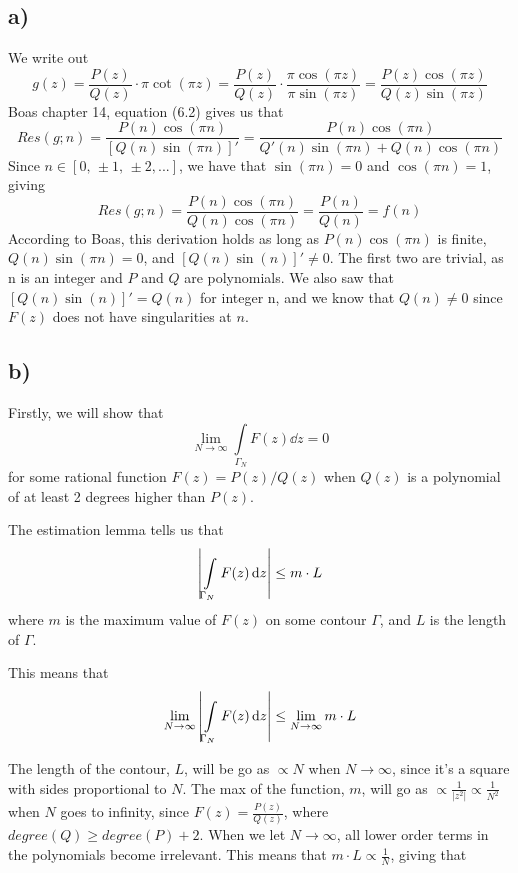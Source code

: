 \documentclass[10pt,a4paper]{article}
\newcommand{\limN}{\lim_{N\rightarrow \infty}}
\newcommand{\Gammaint}{\int\limits_{\Gamma_N}}
\begin{document}
\subsection*{a)}
We write out
\begin{equation}
    g(z) = \frac{P(z)}{Q(z)}\cdot \pi \cot(\pi z) = \frac{P(z)}{Q(z)}\cdot \frac{\pi \cos(\pi z)}{\pi \sin(\pi z)} = \frac{P(z) \cos(\pi z)}{Q(z) \sin(\pi z)}
\end{equation}
Boas chapter 14, equation (6.2) gives us that
\begin{equation}
    Res(g;n) = \frac{P(n) \cos(\pi n)}{[Q(n) \sin(\pi n)]'}  = \frac{P(n) \cos(\pi n)}{Q'(n) \sin(\pi n) + Q(n) \cos(\pi n)} 
\end{equation}
Since $n\in[0,\, \pm 1,\, \pm 2,...]$, we have that $\sin(\pi n) = 0$ and $\cos(\pi n) = 1$, giving
\begin{equation}
    Res(g;n) = \frac{P(n) \cos(\pi n)}{Q(n) \cos(\pi n)} = \frac{P(n)}{Q(n)} = f(n)
\end{equation}
According to Boas, this derivation holds as long as $P(n)\cos(\pi n)$ is finite, $Q(n)\sin(\pi n) = 0$, and $[Q(n)\sin(n)]' \neq 0$. The first two are trivial, as n is an integer and $P$ and $Q$ are polynomials. We also saw that $[Q(n)\sin(n)]' = Q(n)$ for integer n, and we know that $Q(n)\neq 0$ since $F(z)$ does not have singularities at $n$. 



\subsection*{b)}
Firstly, we will show that
\begin{equation}\label{eqn:task2b}
    \limN \Gammaint F(z) \dd{z} = 0
\end{equation}
for some rational function $F(z) = P(z)/Q(z)$ when $Q(z)$ is a polynomial of at least 2 degrees higher than $P(z)$.

The estimation lemma tells us that
\begin{equation}
    \qty|\Gammaint F(z) \dd{z}| \leq m\cdot L
\end{equation}
where $m$ is the maximum value of $F(z)$ on some contour $\Gamma$, and $L$ is the length of $\Gamma$.

This means that 
\begin{equation}
    \limN \qty|\Gammaint F(z) \dd{z}| \leq \limN m\cdot L
\end{equation}

The length of the contour, $L$, will be go as $\propto N$ when $N\rightarrow\infty$, since it's a square with sides proportional to $N$. The max of the function, $m$, will go as $\propto\frac{1}{|z^2|} \propto \frac{1}{N^2}$ when $N$ goes to infinity, since $F(z) = \frac{P(z)}{Q(z)}$, where $degree(Q) \geq degree(P) + 2$. When we let $N\rightarrow \infty$, all lower order terms in the polynomials become irrelevant. This means that $m\cdot L \propto \frac{1}{N}$, giving that
\end{document}
